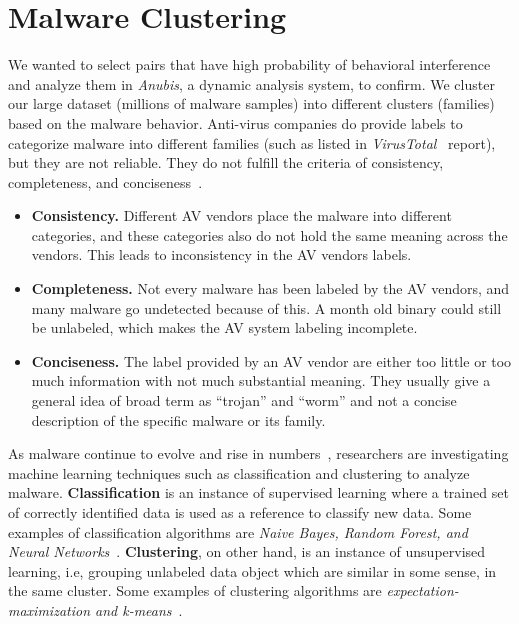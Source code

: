 \section{Malware Clustering}
\label{sec:Malware Clustering}
We wanted to select pairs that have high probability of behavioral interference and analyze them in \emph{Anubis}, a dynamic analysis system, to confirm.
We cluster our large dataset (millions of malware samples) into different clusters (families) based on the malware behavior.
Anti-virus companies do provide labels to categorize malware into different families (such as listed in \emph{VirusTotal}~\cite[]{virustotal} report), but they are not reliable.
They do not fulfill the criteria of consistency, completeness, and conciseness~\cite[]{bailey}.\\
\begin{itemize}
\item \textbf{Consistency.} Different AV vendors place the malware into different categories, and these categories also do not hold the same meaning across the vendors.
This leads to inconsistency in the AV vendors labels.
\item \textbf{Completeness.} Not every malware has been labeled by the AV vendors, and many malware go undetected because of this.
A month old binary could still be unlabeled, which makes the AV system labeling incomplete.
\item \textbf{Conciseness.} The label provided by an AV vendor are either too little or too much information with not much substantial meaning.
They usually give a general idea of broad term as ``trojan'' and ``worm'' and not a concise description of the specific malware or its family.
\end{itemize}
As malware continue to evolve and rise in numbers~\cite[]{barecloud,avtest}, researchers are investigating machine learning techniques such as classification and clustering to analyze malware.
\textbf{Classification} is an instance of supervised learning where a trained set of correctly identified data is used as a reference to classify new data.
Some examples of classification algorithms are \emph{Naive Bayes, Random Forest, and Neural Networks}~\cite[]{classification}.
\textbf{Clustering}, on other hand, is an instance of unsupervised learning, i.e, grouping unlabeled data object which are similar in some sense, in the same cluster.
Some examples of clustering algorithms are \emph{expectation-maximization and k-means}~\cite[]{clustering}.\\

